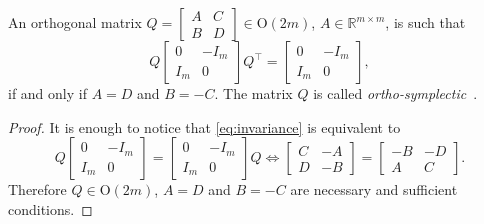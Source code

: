 \documentclass[10pt,twoside,dvipsnames]{siamart1116}
\numberwithin{algorithm}{section}
\numberwithin{equation}{section}
\begin{document}
	\begin{lemma}
		\label{lem:invariance_Im}
		An orthogonal matrix $Q = \begin{bmatrix}
		A&C\\
		B&D
		\end{bmatrix}\in\mathrm{O}(2m)$, $A\in\mathbb{R}^{m\times m}$, is such that 
		\begin{equation}\label{eq:invariance}
		Q\begin{bmatrix}
		0&-I_m\\
		I_m&0
		\end{bmatrix}Q^\top =\begin{bmatrix}
		0&-I_m\\
		I_m&0
		\end{bmatrix},
		\end{equation}
		if and only if $A=D$ and $B = -C$. The matrix $Q$ is called \emph{ortho-symplectic}~\cite{dopico09}.
	\end{lemma}
	\begin{proof}
	It is enough to notice that \eqref{eq:invariance} is equivalent to
	\begin{equation}
		Q\begin{bmatrix}
		0&-I_m\\
		I_m&0
		\end{bmatrix}=\begin{bmatrix}
		0&-I_m\\
		I_m&0
		\end{bmatrix}Q\iff \begin{bmatrix}
		C&-A\\
		D&-B
		\end{bmatrix} = \begin{bmatrix}
		-B&-D\\
		A&C
		\end{bmatrix}.
		\end{equation}
		Therefore $Q\in\mathrm{O}(2m)$, $A=D$ and $B=-C$ are necessary and sufficient conditions.
	\end{proof}
\end{document}
